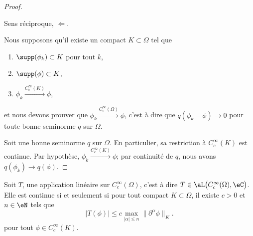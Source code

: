 \begin{proof}
	\begin{proofpart}
		Sens réciproque, \( \Leftarrow\).
	\end{proofpart}
	Nous supposons qu'il existe un compact \( K\subset \Omega\) tel que
	\begin{enumerate}
		\item \( \supp(\phi_k)\subset K\) pour tout \( k\),
		\item
		      \( \supp(\phi)\subset K\),
		\item
		      \( \phi_k\stackrel{ C^{\infty}_c(K)}{\longrightarrow} \phi\),
	\end{enumerate}
	et nous devons prouver que \( \phi_k\stackrel{ C^{\infty}_c(\Omega)}{\longrightarrow} \phi\), c'est à dire que \( q(\phi_k-\phi)\to 0\) pour toute bonne seminorme \( q\) sur \( \Omega\).

	Soit une bonne seminorme \( q\) sur \( \Omega\). En particulier, sa restriction à \( C^{\infty}_c(K)\) est continue. Par hypothèse, \( \phi_k\stackrel{ C^{\infty}_c(K)}{\longrightarrow} \phi\); par continuité de \( q\), nous avons \( q(\phi_k)\to q(\phi)\).
\end{proof}

\begin{theorem}		\label{THOooDFNAooPnDSNN}
	Soit \( T\), une application linéaire sur \( C^{\infty}_c(\Omega)\), c'est à dire \( T\in \aL\big( C^{\infty}_c(\Omega), \eC \big)\). Elle est continue si et seulement si pour tout compact \( K\subset \Omega\), il existe \( c>0\) et \( n\in \eN\) tels que
	\begin{equation}
		| T(\phi) |\leq c\max_{| \alpha |\leq n}\| \partial^{\alpha}\phi \|_{K}.
	\end{equation}
	pour tout \( \phi\in C^{\infty}_c(K)\).
\end{theorem}

